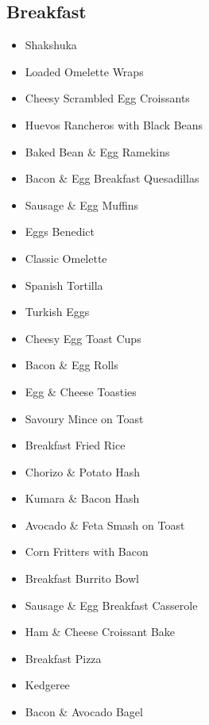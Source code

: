 \subsection*{Breakfast}

\begin{itemize}
  \item \todo Shakshuka 
  \item \todo Loaded Omelette Wraps
  \item \todo Cheesy Scrambled Egg Croissants
  \item \todo Huevos Rancheros with Black Beans
  \item \todo Baked Bean \& Egg Ramekins
  \item \todo Bacon \& Egg Breakfast Quesadillas
  \item \todo Sausage \& Egg Muffins 
  \item \todo Eggs Benedict 
  \item \todo Classic Omelette
  \item \todo Spanish Tortilla
  \item \todo Turkish Eggs 
  \item \todo Cheesy Egg Toast Cups
  \item \todo Bacon \& Egg Rolls
  \item \todo Egg \& Cheese Toasties
\end{itemize}

\begin{itemize}
  \item \todo Savoury Mince on Toast
  \item \todo Breakfast Fried Rice
  \item \todo Chorizo \& Potato Hash
  \item \todo Kumara \& Bacon Hash
  \item \todo Avocado \& Feta Smash on Toast
  \item \todo Corn Fritters with Bacon
  \item \todo Breakfast Burrito Bowl
  \item \todo Sausage \& Egg Breakfast Casserole
  \item \todo Ham \& Cheese Croissant Bake
  \item \todo Breakfast Pizza
  \item \todo Kedgeree
  \item \todo Bacon \& Avocado Bagel
\end{itemize}

